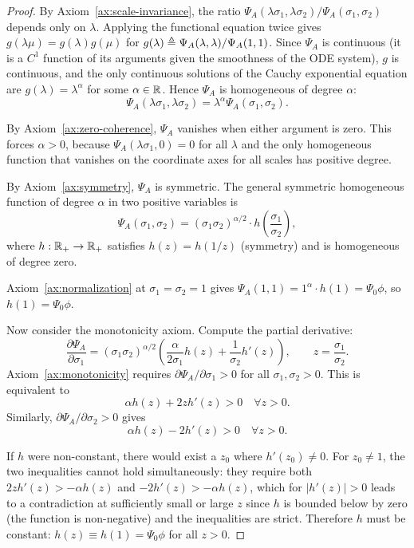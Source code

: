 \begin{proof}
By Axiom~\ref{ax:scale-invariance}, the ratio
$\Psi_A(\lambda \sigma_1, \lambda \sigma_2) / \Psi_A(\sigma_1, \sigma_2)$
depends only on $\lambda$. Applying the functional equation twice gives
$g(\lambda \mu) = g(\lambda) g(\mu)$ for $g(\lambda) \triangleq \Psi_A(\lambda, \lambda) / \Psi_A(1, 1)$.
Since $\Psi_A$ is continuous (it is a $C^1$ function of its arguments
given the smoothness of the ODE system), $g$ is continuous, and the only
continuous solutions of the Cauchy exponential equation are
$g(\lambda) = \lambda^\alpha$ for some $\alpha \in \mathbb{R}$. Hence $\Psi_A$
is homogeneous of degree $\alpha$:
\[
\Psi_A(\lambda \sigma_1, \lambda \sigma_2) = \lambda^\alpha \Psi_A(\sigma_1, \sigma_2).
\]

By Axiom~\ref{ax:zero-coherence}, $\Psi_A$ vanishes when either argument
is zero. This forces $\alpha > 0$, because $\Psi_A(\lambda \sigma_1, 0) = 0$
for all $\lambda$ and the only homogeneous function that vanishes on the
coordinate axes for all scales has positive degree.

By Axiom~\ref{ax:symmetry}, $\Psi_A$ is symmetric. The general symmetric
homogeneous function of degree $\alpha$ in two positive variables is
\[
\Psi_A(\sigma_1, \sigma_2) = (\sigma_1 \sigma_2)^{\alpha/2} \cdot
h\!\left(\frac{\sigma_1}{\sigma_2}\right),
\]
where $h: \mathbb{R}_+ \to \mathbb{R}_+$ satisfies $h(z) = h(1/z)$ (symmetry) and is
homogeneous of degree zero.

Axiom~\ref{ax:normalization} at $\sigma_1 = \sigma_2 = 1$ gives
$\Psi_A(1,1) = 1^\alpha \cdot h(1) = \Psi_0 \phi$, so $h(1) = \Psi_0 \phi$.

Now consider the monotonicity axiom. Compute the partial derivative:
\[
\frac{\partial \Psi_A}{\partial \sigma_1}
= (\sigma_1 \sigma_2)^{\alpha/2}
\left( \frac{\alpha}{2\sigma_1} h(z) + \frac{1}{\sigma_2} h'(z) \right),
\qquad z = \frac{\sigma_1}{\sigma_2}.
\]
Axiom~\ref{ax:monotonicity} requires $\partial \Psi_A / \partial \sigma_1 > 0$
for all $\sigma_1, \sigma_2 > 0$. This is equivalent to
\[
\alpha h(z) + 2z h'(z) > 0 \quad \forall z > 0.
\]
Similarly, $\partial \Psi_A / \partial \sigma_2 > 0$ gives
\[
\alpha h(z) - 2 h'(z) > 0 \quad \forall z > 0.
\]

If $h$ were non-constant, there would exist a $z_0$ where $h'(z_0) \neq 0$.
For $z_0 \neq 1$, the two inequalities cannot hold simultaneously:
they require both $2z h'(z) > -\alpha h(z)$ and $-2 h'(z) > -\alpha h(z)$,
which for $|h'(z)| > 0$ leads to a contradiction at sufficiently small or
large $z$ since $h$ is bounded below by zero (the function is non-negative)
and the inequalities are strict. Therefore $h$ must be constant:
$h(z) \equiv h(1) = \Psi_0 \phi$ for all $z > 0$.


\end{proof}
